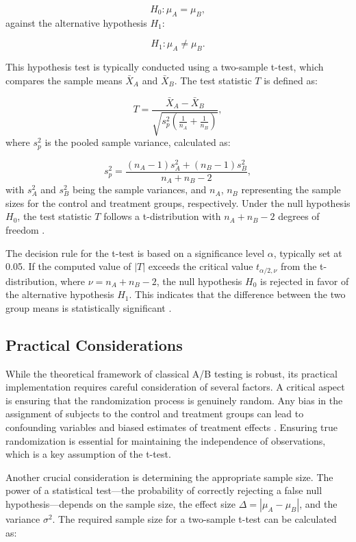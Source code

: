 \documentclass[magisterska, english]{pwr_wmat_praca_dyplomowa}
\theoremstyle{plain}
\numberwithin{theorem}{chapter}
\theoremstyle{definition}
\numberwithin{theorem}{chapter}
\begin{document}
\[
H_0: \mu_A = \mu_B,
\]
against the alternative hypothesis \( H_1 \):

\[
H_1: \mu_A \neq \mu_B.
\]

This hypothesis test is typically conducted using a two-sample t-test, which compares the sample means \( \bar{X}_A \) and \( \bar{X}_B \). The test statistic \( T \) is defined as:

\[
T = \frac{\bar{X}_A - \bar{X}_B}{\sqrt{s_p^2\left(\frac{1}{n_A} + \frac{1}{n_B}\right)}},
\]
where \( s_p^2 \) is the pooled sample variance, calculated as:

\[
s_p^2 = \frac{(n_A - 1)s_A^2 + (n_B - 1)s_B^2}{n_A + n_B - 2},
\]
with \( s_A^2 \) and \( s_B^2 \) being the sample variances, and \( n_A \), \( n_B \) representing the sample sizes for the control and treatment groups, respectively. Under the null hypothesis \( H_0 \), the test statistic \( T \) follows a t-distribution with \( n_A + n_B - 2 \) degrees of freedom \cite{Rice2006}.

The decision rule for the t-test is based on a significance level \( \alpha \), typically set at 0.05. If the computed value of \( |T| \) exceeds the critical value \( t_{\alpha/2, \nu} \) from the t-distribution, where \( \nu = n_A + n_B - 2 \), the null hypothesis \( H_0 \) is rejected in favor of the alternative hypothesis \( H_1 \). This indicates that the difference between the two group means is statistically significant \cite{Student1908}.


\subsection{Practical Considerations}

While the theoretical framework of classical A/B testing is robust, its practical implementation requires careful consideration of several factors. A critical aspect is ensuring that the randomization process is genuinely random. Any bias in the assignment of subjects to the control and treatment groups can lead to confounding variables and biased estimates of treatment effects \cite{Kohavi2013}. Ensuring true randomization is essential for maintaining the independence of observations, which is a key assumption of the t-test.

Another crucial consideration is determining the appropriate sample size. The power of a statistical test—the probability of correctly rejecting a false null hypothesis—depends on the sample size, the effect size $\Delta = |\mu_A - \mu_B|$, and the variance $\sigma^2$. The required sample size for a two-sample t-test can be calculated as:
\end{document}
